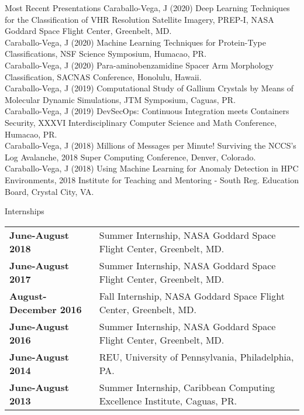 \documentclass{resume} %
\begin{document}

\begin{rSection}{Most Recent Presentations}
Caraballo-Vega, J (2020) Deep Learning Techniques for the Classification of VHR Resolution Satellite Imagery, PREP-I, NASA Goddard Space Flight Center, Greenbelt, MD. \\
Caraballo-Vega, J (2020) Machine Learning Techniques for Protein-Type Classifications, NSF Science Symposium, Humacao, PR. \\
Caraballo-Vega, J (2020) Para-aminobenzamidine Spacer Arm Morphology Classification, SACNAS Conference, Honolulu, Hawaii. \\
Caraballo-Vega, J (2019) Computational Study of Gallium Crystals by Means of Molecular Dynamic Simulations, JTM Symposium, Caguas, PR. \\
Caraballo-Vega, J (2019) DevSecOps: Continuous Integration meets Containers Security, XXXVI Interdisciplinary Computer Science and Math Conference, Humacao, PR. \\
Caraballo-Vega, J (2018) Millions of Messages per Minute! Surviving the NCCS's Log Avalanche, 2018 Super Computing Conference, Denver, Colorado. \\
Caraballo-Vega, J (2018) Using Machine Learning for Anomaly Detection in HPC Environments, 2018 Institute for Teaching and Mentoring - South Reg. Education Board, Crystal City, VA.
\end{rSection}


\begin{rSection}{Internships}

\begin{tabular}{ @{} >{\bfseries}l @{\hspace{6ex}} l }

June-August 2018 & Summer Internship, NASA Goddard Space Flight Center, Greenbelt, MD. \\
June-August 2017 & Summer Internship, NASA Goddard Space Flight Center, Greenbelt, MD. \\
August-December 2016 & Fall Internship, NASA Goddard Space Flight Center, Greenbelt, MD. \\
June-August 2016 & Summer Internship, NASA Goddard Space Flight Center, Greenbelt, MD. \\
June-August 2014 & REU, University of Pennsylvania, Philadelphia, PA. \\
June-August 2013 & Summer Internship, Caribbean Computing Excellence Institute, Caguas, PR. \\
\end{tabular}

\end{rSection}
\end{document}
